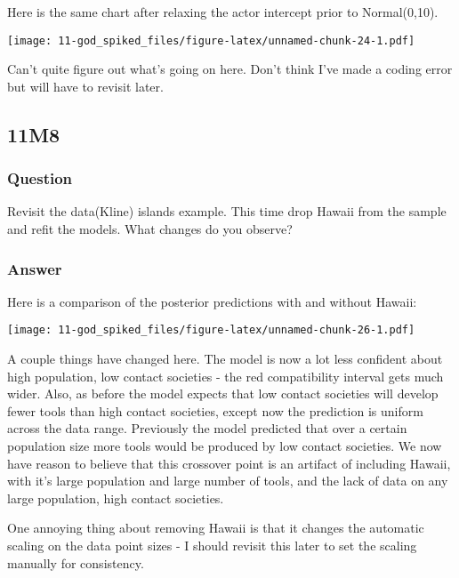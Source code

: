 \documentclass[
]{book}
\begin{document}
Here is the same chart after relaxing the actor intercept prior to Normal(0,10).

\texttt{[image: 11-god\_spiked\_files/figure-latex/unnamed-chunk-24-1.pdf]}

Can't quite figure out what's going on here. Don't think I've made a coding error but will have to revisit later.

\hypertarget{m8}{%
\subsection*{11M8}\label{m8}}

\hypertarget{question-92}{%
\subsubsection*{Question}\label{question-92}}

Revisit the data(Kline) islands example. This time drop Hawaii from the sample and refit the models. What changes do you observe?

\hypertarget{answer-92}{%
\subsubsection*{Answer}\label{answer-92}}

Here is a comparison of the posterior predictions with and without Hawaii:

\texttt{[image: 11-god\_spiked\_files/figure-latex/unnamed-chunk-26-1.pdf]}

A couple things have changed here. The model is now a lot less confident about high population, low contact societies - the red compatibility interval gets much wider.
Also, as before the model expects that low contact societies will develop fewer tools than high contact societies, except now the prediction is uniform across the data range. Previously the model predicted that over a certain population size more tools would be produced by low contact societies. We now have reason to believe that this crossover point is an artifact of including Hawaii, with it's large population and large number of tools, and the lack of data on any large population, high contact societies.

One annoying thing about removing Hawaii is that it changes the automatic scaling on the data point sizes - I should revisit this later to set the scaling manually for consistency.
\end{document}
